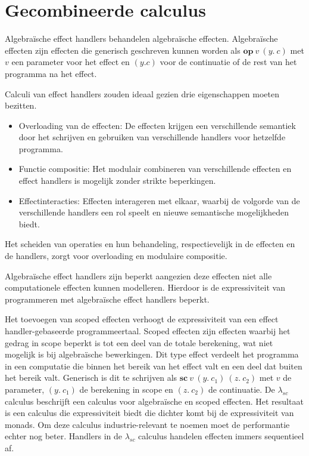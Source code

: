 \section{Gecombineerde calculus}
Algebraïsche effect handlers behandelen algebraïsche effecten. Algebraïsche effecten zijn effecten die generisch geschreven kunnen worden als $\textbf{op}\:v\:(y.\:c)$ met $v$ een parameter voor het effect en $(y. c)$ voor de continuatie of de rest van het programma na het effect.\newline

Calculi van effect handlers zouden ideaal gezien drie eigenschappen moeten bezitten.
\begin{itemize}
    \item Overloading van de effecten: De effecten krijgen een verschillende semantiek door het schrijven en gebruiken van verschillende handlers voor hetzelfde programma.
    \item  Functie compositie: Het modulair combineren van verschillende effecten en effect handlers is mogelijk zonder strikte beperkingen.
    \item Effectinteracties: Effecten interageren met elkaar, waarbij de volgorde van de verschillende handlers een rol speelt en nieuwe semantische mogelijkheden biedt.
\end{itemize}

Het scheiden van operaties en hun behandeling, respectievelijk in de effecten en de handlers, zorgt voor overloading en modulaire compositie. \newline

Algebraïsche effect handlers zijn beperkt aangezien deze effecten niet alle computationele effecten kunnen modelleren. Hierdoor is de expressiviteit van programmeren met algebraïsche effect handlers beperkt. \newline

Het toevoegen van scoped effecten verhoogt de expressiviteit van een effect handler-gebaseerde programmeertaal. Scoped effecten zijn effecten waarbij het gedrag in scope beperkt is tot een deel van de totale berekening, wat niet mogelijk is bij algebraïsche bewerkingen. Dit type effect verdeelt het programma in een computatie die binnen het bereik van het effect valt en een deel dat buiten het bereik valt. Generisch is dit te schrijven als $\textbf{sc}\:v\:(y.\:c_1)\:(z.\:c_2)$ met $v$ de parameter, $(y.\:c_1)$ de berekening in scope en $(z.\:c_2)$ de continuatie. De $\lambda_{sc}$ calculus \cite{Bosman2022} beschrijft een calculus voor algebraïsche en scoped effecten. Het resultaat is een calculus die expressiviteit biedt die dichter komt bij de expressiviteit van monads. Om deze calculus industrie-relevant te noemen moet de performantie echter nog beter. Handlers in de $\lambda_{sc}$ calculus handelen effecten immers sequentieel af. \newline

